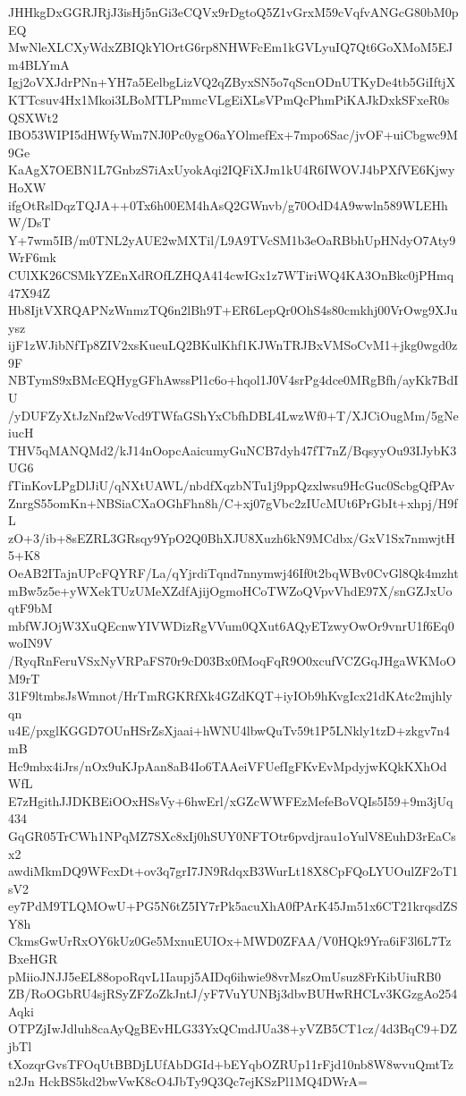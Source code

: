 JHHkgDxGGRJRjJ3isHj5nGi3eCQVx9rDgtoQ5Z1vGrxM59cVqfvANGcG80bM0pEQ
MwNleXLCXyWdxZBIQkYlOrtG6rp8NHWFcEm1kGVLyuIQ7Qt6GoXMoM5EJm4BLYmA
Igj2oVXJdrPNn+YH7a5EelbgLizVQ2qZByxSN5o7qScnODnUTKyDe4tb5GiIftjX
KTTcsuv4Hx1Mkoi3LBoMTLPmmcVLgEiXLsVPmQcPhmPiKAJkDxkSFxeR0sQSXWt2
IBO53WIPI5dHWfyWm7NJ0Pc0ygO6aYOlmefEx+7mpo6Sac/jvOF+uiCbgwc9M9Ge
KaAgX7OEBN1L7GnbzS7iAxUyokAqi2IQFiXJm1kU4R6IWOVJ4bPXfVE6KjwyHoXW
ifgOtRslDqzTQJA++0Tx6h00EM4hAsQ2GWnvb/g70OdD4A9wwln589WLEHhW/DsT
Y+7wm5IB/m0TNL2yAUE2wMXTil/L9A9TVcSM1b3eOaRBbhUpHNdyO7Aty9WrF6mk
CUlXK26CSMkYZEnXdROfLZHQA414cwIGx1z7WTiriWQ4KA3OnBkc0jPHmq47X94Z
Hb8IjtVXRQAPNzWnmzTQ6n2lBh9T+ER6LepQr0OhS4s80cmkhj00VrOwg9XJuysz
ijF1zWJibNfTp8ZIV2xsKueuLQ2BKulKhf1KJWnTRJBxVMSoCvM1+jkg0wgd0z9F
NBTymS9xBMcEQHygGFhAwssPl1c6o+hqol1J0V4srPg4dce0MRgBfh/ayKk7BdIU
/yDUFZyXtJzNnf2wVcd9TWfaGShYxCbfhDBL4LwzWf0+T/XJCiOugMm/5gNeiucH
THV5qMANQMd2/kJ14nOopcAaicumyGuNCB7dyh47fT7nZ/BqsyyOu93IJybK3UG6
fTinKovLPgDlJiU/qNXtUAWL/nbdfXqzbNTu1j9ppQzxlwsu9HcGuc0ScbgQfPAv
ZnrgS55omKn+NBSiaCXaOGhFhn8h/C+xj07gVbc2zIUcMUt6PrGbIt+xhpj/H9fL
zO+3/ib+8sEZRL3GRsqy9YpO2Q0BhXJU8Xuzh6kN9MCdbx/GxV1Sx7nmwjtH5+K8
OeAB2ITajnUPcFQYRF/La/qYjrdiTqnd7nnymwj46If0t2bqWBv0CvGl8Qk4mzht
mBw5z5e+yWXekTUzUMeXZdfAjijOgmoHCoTWZoQVpvVhdE97X/snGZJxUoqtF9bM
mbfWJOjW3XuQEcnwYIVWDizRgVVum0QXut6AQyETzwyOwOr9vnrU1f6Eq0woIN9V
/RyqRnFeruVSxNyVRPaFS70r9cD03Bx0fMoqFqR9O0xcufVCZGqJHgaWKMoOM9rT
31F9ltmbsJsWmnot/HrTmRGKRfXk4GZdKQT+iyIOb9hKvgIcx21dKAtc2mjhlyqn
u4E/pxglKGGD7OUnHSrZsXjaai+hWNU4lbwQuTv59t1P5LNkly1tzD+zkgv7n4mB
Hc9mbx4iJrs/nOx9uKJpAan8aB4Io6TAAeiVFUefIgFKvEvMpdyjwKQkKXhOdWfL
E7zHgithJJDKBEiOOxHSsVy+6hwErl/xGZcWWFEzMefeBoVQIs5I59+9m3jUq434
GqGR05TrCWh1NPqMZ7SXc8xIj0hSUY0NFTOtr6pvdjrau1oYulV8EuhD3rEaCsx2
awdiMkmDQ9WFcxDt+ov3q7grI7JN9RdqxB3WurLt18X8CpFQoLYUOulZF2oT1sV2
ey7PdM9TLQMOwU+PG5N6tZ5IY7rPk5acuXhA0fPArK45Jm51x6CT21krqsdZSY8h
CkmsGwUrRxOY6kUz0Ge5MxnuEUIOx+MWD0ZFAA/V0HQk9Yra6iF3l6L7TzBxeHGR
pMiioJNJJ5eEL88opoRqvL1Iaupj5AIDq6ihwie98vrMszOmUsuz8FrKibUiuRB0
ZB/RoOGbRU4sjRSyZFZoZkJntJ/yF7VuYUNBj3dbvBUHwRHCLv3KGzgAo254Aqki
OTPZjIwJdluh8caAyQgBEvHLG33YxQCmdJUa38+yVZB5CT1cz/4d3BqC9+DZjbTl
tXozqrGvsTFOqUtBBDjLUfAbDGId+bEYqbOZRUp11rFjd10nb8W8wvuQmtTzn2Jn
HckBS5kd2bwVwK8cO4JbTy9Q3Qc7ejKSzPl1MQ4DWrA=
